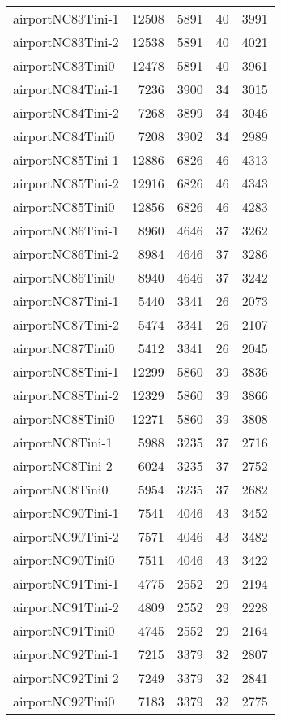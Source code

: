 \begin{longtable}{lrrrr}
airportNC83Tini-1 & 12508 & 5891 & 40 & 3991 \\
airportNC83Tini-2 & 12538 & 5891 & 40 & 4021 \\
airportNC83Tini0 & 12478 & 5891 & 40 & 3961 \\
airportNC84Tini-1 & 7236 & 3900 & 34 & 3015 \\
airportNC84Tini-2 & 7268 & 3899 & 34 & 3046 \\
airportNC84Tini0 & 7208 & 3902 & 34 & 2989 \\
airportNC85Tini-1 & 12886 & 6826 & 46 & 4313 \\
airportNC85Tini-2 & 12916 & 6826 & 46 & 4343 \\
airportNC85Tini0 & 12856 & 6826 & 46 & 4283 \\
airportNC86Tini-1 & 8960 & 4646 & 37 & 3262 \\
airportNC86Tini-2 & 8984 & 4646 & 37 & 3286 \\
airportNC86Tini0 & 8940 & 4646 & 37 & 3242 \\
airportNC87Tini-1 & 5440 & 3341 & 26 & 2073 \\
airportNC87Tini-2 & 5474 & 3341 & 26 & 2107 \\
airportNC87Tini0 & 5412 & 3341 & 26 & 2045 \\
airportNC88Tini-1 & 12299 & 5860 & 39 & 3836 \\
airportNC88Tini-2 & 12329 & 5860 & 39 & 3866 \\
airportNC88Tini0 & 12271 & 5860 & 39 & 3808 \\
airportNC8Tini-1 & 5988 & 3235 & 37 & 2716 \\
airportNC8Tini-2 & 6024 & 3235 & 37 & 2752 \\
airportNC8Tini0 & 5954 & 3235 & 37 & 2682 \\
airportNC90Tini-1 & 7541 & 4046 & 43 & 3452 \\
airportNC90Tini-2 & 7571 & 4046 & 43 & 3482 \\
airportNC90Tini0 & 7511 & 4046 & 43 & 3422 \\
airportNC91Tini-1 & 4775 & 2552 & 29 & 2194 \\
airportNC91Tini-2 & 4809 & 2552 & 29 & 2228 \\
airportNC91Tini0 & 4745 & 2552 & 29 & 2164 \\
airportNC92Tini-1 & 7215 & 3379 & 32 & 2807 \\
airportNC92Tini-2 & 7249 & 3379 & 32 & 2841 \\
airportNC92Tini0 & 7183 & 3379 & 32 & 2775 \\

\end{longtable}
